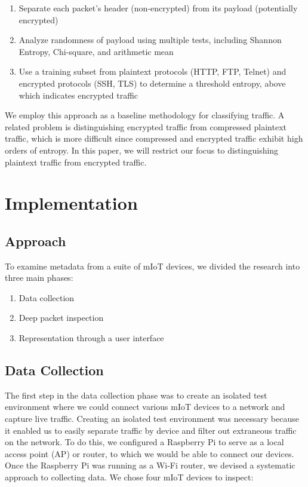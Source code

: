 \begin{enumerate}
  \item Separate each packet's header (non-encrypted) from its payload (potentially encrypted)
  \item Analyze randomness of payload using multiple tests, including Shannon Entropy, Chi-square, and arithmetic mean
  \item Use a training subset from plaintext protocols (HTTP, FTP, Telnet) and encrypted protocols (SSH, TLS) to determine a threshold entropy, above which indicates encrypted traffic
\end{enumerate}

We employ this approach as a baseline methodology for classifying traffic. A related problem is distinguishing encrypted traffic from compressed plaintext traffic, which is more difficult since compressed and encrypted traffic exhibit high orders of entropy. In this paper, we will restrict our focus to distinguishing plaintext traffic from encrypted traffic.  

\section{Implementation}

\subsection{Approach}

To examine metadata from a suite of mIoT devices, we divided the research into three main phases: 

\begin{enumerate}
  \item Data collection
  \item Deep packet inspection
  \item Representation through a user interface
\end{enumerate}

\subsection{Data Collection}

The first step in the data collection phase was to create an isolated test environment where we could connect various mIoT devices to a network and capture live traffic. Creating an isolated test environment was necessary because it enabled us to easily separate traffic by device and filter out extraneous traffic on the network. To do this, we configured a Raspberry Pi to serve as a local access point (AP) or router, to which we would be able to connect our devices. Once the Raspberry Pi was running as a Wi-Fi router, we devised a systematic approach to collecting data. We chose four mIoT devices to inspect:

